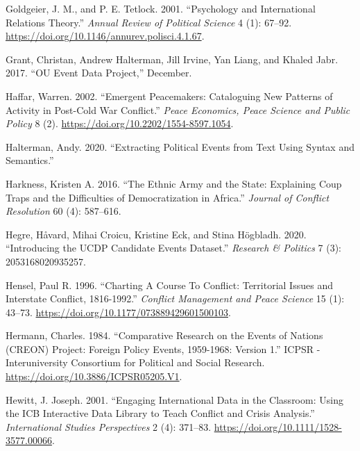 \documentclass{article}
\newlength{\cslhangindent}
\newlength{\cslentryspacingunit} %
\newenvironment{CSLReferences}[2] %
 {%
  \setlength{\parindent}{0pt}
  \ifodd #1
  \let\oldpar\par
  \def\par{\hangindent=\cslhangindent\oldpar}
  \fi
  \setlength{\parskip}{#2\cslentryspacingunit}
 }%
 {}
\begin{document}
\begin{CSLReferences}{1}{0}
\leavevmode{}%
Goldgeier, J. M., and P. E. Tetlock. 2001. {``Psychology and
{International Relations Theory}.''} \emph{Annual Review of Political
Science} 4 (1): 67--92.
\url{https://doi.org/10.1146/annurev.polisci.4.1.67}.

\leavevmode{}%
Grant, Christan, Andrew Halterman, Jill Irvine, Yan Liang, and Khaled
Jabr. 2017. {``{OU Event Data Project},''} December.

\leavevmode{}%
Haffar, Warren. 2002. {``Emergent {Peacemakers}: {Cataloguing New
Patterns} of {Activity} in {Post-Cold War Conflict}.''} \emph{Peace
Economics, Peace Science and Public Policy} 8 (2).
\url{https://doi.org/10.2202/1554-8597.1054}.

\leavevmode{}%
Halterman, Andy. 2020. {``Extracting {Political Events} from {Text Using
Syntax} and {Semantics}.''}

\leavevmode{}%
Harkness, Kristen A. 2016. {``The Ethnic Army and the State:
{Explaining} Coup Traps and the Difficulties of Democratization in
{Africa}.''} \emph{Journal of Conflict Resolution} 60 (4): 587--616.

\leavevmode{}%
Hegre, Håvard, Mihai Croicu, Kristine Eck, and Stina Högbladh. 2020.
{``Introducing the {UCDP Candidate Events Dataset}.''} \emph{Research \&
Politics} 7 (3): 2053168020935257.

\leavevmode{}%
Hensel, Paul R. 1996. {``Charting {A Course To Conflict}: {Territorial
Issues} and {Interstate Conflict}, 1816-1992.''} \emph{Conflict
Management and Peace Science} 15 (1): 43--73.
\url{https://doi.org/10.1177/073889429601500103}.

\leavevmode{}%
Hermann, Charles. 1984. {``Comparative {Research} on the {Events} of
{Nations} ({CREON}) {Project}: {Foreign Policy Events}, 1959-1968:
{Version} 1.''} {ICPSR - Interuniversity Consortium for Political and
Social Research}. \url{https://doi.org/10.3886/ICPSR05205.V1}.

\leavevmode{}%
Hewitt, J. Joseph. 2001. {``Engaging {International Data} in the
{Classroom}: {Using} the {ICB Interactive Data Library} to {Teach
Conflict} and {Crisis Analysis}.''} \emph{International Studies
Perspectives} 2 (4): 371--83.
\url{https://doi.org/10.1111/1528-3577.00066}.


\end{CSLReferences}
\end{document}

